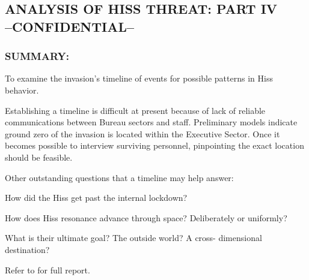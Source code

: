 \subsection*{ANALYSIS OF HISS THREAT: PART IV \\
	--CONFIDENTIAL--}
\subsubsection*{SUMMARY:}
\par To examine the invasion's timeline of events for possible patterns
in Hiss behavior.
\par Establishing a timeline is difficult at present because of lack of
reliable communications between Bureau sectors and staff.
Preliminary models indicate ground zero of the invasion is located
within the Executive Sector. Once it becomes possible to
interview surviving personnel, pinpointing the exact location
should be feasible.
\par Other outstanding questions that a timeline may help answer:
\par How did the Hiss get past the internal lockdown?
\par How does Hiss resonance advance through space? Deliberately
or uniformly?
\par What is their ultimate goal? The outside world? A cross-
dimensional destination?
\par Refer to  for full report.